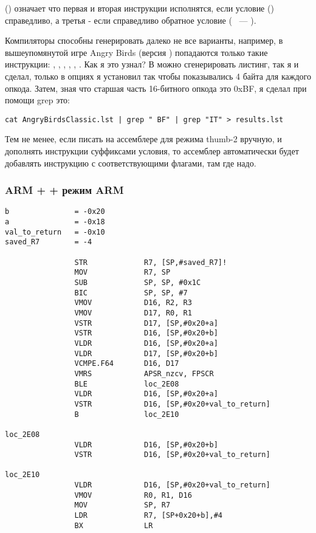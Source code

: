  () означает что первая и вторая инструкции исполнятся, если 
условие  () справедливо,
а третья - если справедливо обратное условие ( ~--- ).

Компиляторы способны генерировать далеко не все варианты, например, в вышеупомянутой игре Angry Birds
(версия ) попадаются только такие инструкции: , , , , 
, .
Как я это узнал? В \IDA можно сгенерировать листинг, так я и сделал, только в опциях я установил так 
чтобы показывались 4 байта для каждого опкода. Затем, зная что старшая часть 16-битного опкода  
это 0xBF, я сделал при помощи grep это:

\begin{lstlisting}
cat AngryBirdsClassic.lst | grep " BF" | grep "IT" > results.lst
\end{lstlisting}

Тем не менее, если писать на ассемблере для режима thumb-2 вручную, и дополнять инструкции суффиксами
условия, то ассемблер автоматически будет добавлять инструкцию  с соответствующими флагами, там
где надо.

\subsubsection{ARM + \NonOptimizingXcode + режим ARM}

\begin{lstlisting}
b               = -0x20
a               = -0x18
val_to_return   = -0x10
saved_R7        = -4

                STR             R7, [SP,#saved_R7]!
                MOV             R7, SP
                SUB             SP, SP, #0x1C
                BIC             SP, SP, #7
                VMOV            D16, R2, R3
                VMOV            D17, R0, R1
                VSTR            D17, [SP,#0x20+a]
                VSTR            D16, [SP,#0x20+b]
                VLDR            D16, [SP,#0x20+a]
                VLDR            D17, [SP,#0x20+b]
                VCMPE.F64       D16, D17
                VMRS            APSR_nzcv, FPSCR
                BLE             loc_2E08
                VLDR            D16, [SP,#0x20+a]
                VSTR            D16, [SP,#0x20+val_to_return]
                B               loc_2E10

loc_2E08
                VLDR            D16, [SP,#0x20+b]
                VSTR            D16, [SP,#0x20+val_to_return]

loc_2E10
                VLDR            D16, [SP,#0x20+val_to_return]
                VMOV            R0, R1, D16
                MOV             SP, R7
                LDR             R7, [SP+0x20+b],#4
                BX              LR
\end{lstlisting}

